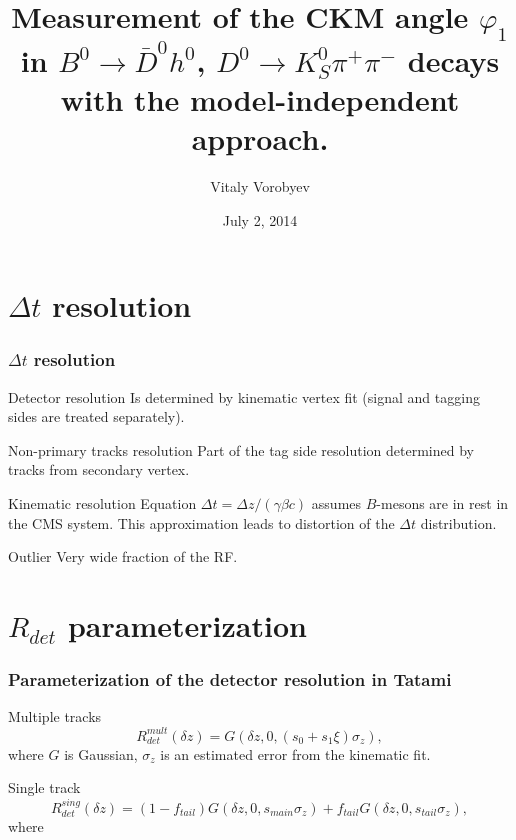 \documentclass[10 pt,compress,mathserif]{beamer}
\newcommand{\dkspp}{\ensuremath{D^0\to K_S^0\pi^+\pi^-}\xspace}
\newcommand{\bdh}{\ensuremath{B^0\to \bar D^0h^0}\xspace}
\begin{document}
\title{Measurement of the CKM angle $\varphi_1$ in \bdh, \dkspp decays with the model-independent approach.}
\author{Vitaly Vorobyev}
\date{July 2, 2014}
\frame{\titlepage}

\section{$\Delta t$ resolution}
\begin{frame}
 \frametitle{$\Delta t$ resolution}
 \begin{block}{Detector resolution}
  Is determined by kinematic vertex fit (signal and tagging sides are treated separately).
 \end{block}
 \begin{block}{Non-primary tracks resolution}
  Part of the tag side resolution determined by tracks from secondary vertex.
 \end{block}
 \begin{block}{Kinematic resolution}
  Equation $\Delta t = \Delta z/(\gamma\beta c)$ assumes $B$-mesons are in rest in the CMS system. This approximation leads to distortion of the $\Delta t$ distribution.
 \end{block}
 \begin{block}{Outlier}
  Very wide fraction of the RF.
 \end{block}
\end{frame}


\section{$R_{det}$ parameterization}
\begin{frame}
 \frametitle{Parameterization of the detector resolution in Tatami}
 \begin{block}{Multiple tracks}
  \begin{equation}
   R_{det}^{mult}(\delta z) = G\left(\delta z,0,(s_0+s_1\xi)\sigma_z\right),
  \end{equation}
   where $G$ is Gaussian, $\sigma_z$ is an estimated error from the kinematic fit.
  \end{block}

  \begin{block}{Single track}
   \begin{equation}
    R_{det}^{sing}(\delta z) = (1-f_{tail})G(\delta z,0,s_{main}\sigma_z)+f_{tail}G(\delta z,0,s_{tail}\sigma_z),
   \end{equation}
   where
  \end{block}
\end{frame}
\end{document}
